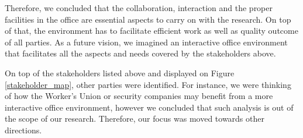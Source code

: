 Therefore, we concluded that the collaboration, interaction and the proper facilities in the office are essential aspects to carry on with the research. On top of that, the environment has to facilitate efficient work as well as quality outcome of all parties. As a future vision, we imagined an interactive office environment that facilitates all the aspects and needs covered by the stakeholders above. 

On top of the stakeholders listed above and displayed on Figure \ref{stakeholder_map}, other parties were identified. For instance, we were thinking of how the Worker's Union or security companies may benefit from a more interactive office environment, however we concluded that such analysis is out of the scope of our research. Therefore, our focus was moved towards other directions. 